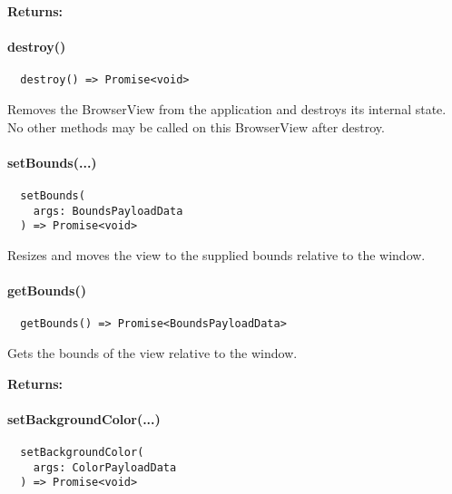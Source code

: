 \textbf{Returns:} 


\paragraph{destroy()}

\begin{verbatim}
  destroy() => Promise<void>
\end{verbatim}

Removes the BrowserView from the application and destroys its internal state.
No other methods may be called on this BrowserView after destroy.


\paragraph{setBounds(...)}

\begin{verbatim}
  setBounds(
    args: BoundsPayloadData
  ) => Promise<void>
\end{verbatim}

Resizes and moves the view to the supplied bounds relative to the window.


\paragraph{getBounds()}

\begin{verbatim}
  getBounds() => Promise<BoundsPayloadData>
\end{verbatim}

Gets the bounds of the view relative to the window.

\textbf{Returns:} 


\paragraph{setBackgroundColor(...)}

\begin{verbatim}
  setBackgroundColor(
    args: ColorPayloadData
  ) => Promise<void>
\end{verbatim}

